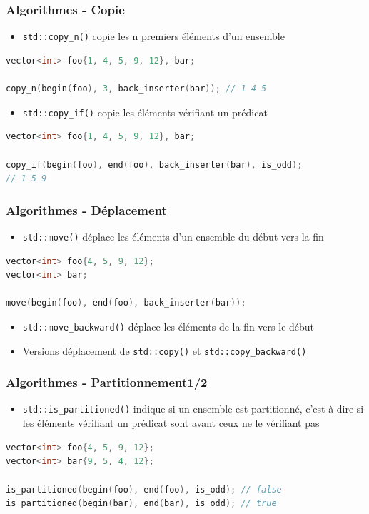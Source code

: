 \documentclass[C++.tex]{subfiles}
\begin{document}
\begin{frame}[fragile]
	\frametitle{Algorithmes - Copie}
	\begin{itemize}
		\item \lstinline|std::copy_n()| copie les n premiers éléments d'un ensemble
	\end{itemize}

	\begin{lstlisting}[language=C++]
vector<int> foo{1, 4, 5, 9, 12}, bar;

copy_n(begin(foo), 3, back_inserter(bar)); // 1 4 5\end{lstlisting}

	\begin{itemize}
		\item \lstinline|std::copy_if()| copie les éléments vérifiant un prédicat
	\end{itemize}

	\begin{lstlisting}[language=C++]
vector<int> foo{1, 4, 5, 9, 12}, bar;

copy_if(begin(foo), end(foo), back_inserter(bar), is_odd);
// 1 5 9\end{lstlisting}
\end{frame}

\begin{frame}[fragile]
	\frametitle{Algorithmes - Déplacement}
	\begin{itemize}
		\item \lstinline|std::move()| déplace les éléments d'un ensemble du début vers la fin
	\end{itemize}

	\begin{lstlisting}[language=C++]
vector<int> foo{4, 5, 9, 12};
vector<int> bar;

move(begin(foo), end(foo), back_inserter(bar));\end{lstlisting}

	\begin{itemize}
		\item \lstinline|std::move_backward()| déplace les éléments de la fin vers le début
		\item Versions \og déplacement\fg{} de \lstinline|std::copy()| et \lstinline|std::copy_backward()|
	\end{itemize}
\end{frame}

\begin{frame}[fragile]
	\frametitle{Algorithmes - Partitionnement\titlehfill{}1/2}
	\begin{itemize}
		\item \lstinline|std::is_partitioned()| indique si un ensemble est partitionné, c'est à dire si les éléments vérifiant un prédicat sont avant ceux ne le vérifiant pas
	\end{itemize}

	\begin{lstlisting}[language=C++]
vector<int> foo{4, 5, 9, 12};
vector<int> bar{9, 5, 4, 12};

is_partitioned(begin(foo), end(foo), is_odd); // false
is_partitioned(begin(bar), end(bar), is_odd); // true\end{lstlisting}
\end{frame}
\end{document}
